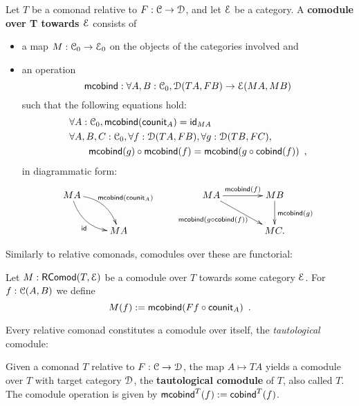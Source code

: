 \documentclass[a4paper,USenglish]{lipics}
\newcommand{\fat}[1]{\textbf{#1}}
\newcommand{\itemizedist}{.5em}
\begin{document}
\begin{defn}%
\label{def:comodule}
 Let $T$ be a comonad relative to $F:\C\to\D$, and let $\E$ be a category.
 A \fat{comodule over T towards $\E$} consists of
   \begin{itemize}\setlength{\itemsep}{\itemizedist}
   \item a map $M:\C_0 \to \E_0$ on the objects of the categories involved and
   \item an operation \[\mcobind: \forall A,B:\C_0, \D(TA,FB) \to \E(MA,MB)\] such that the following equations hold:
 \begin{align}
 &  \forall A : \C_0, \mcobind(\counit_A) = \id_{MA} \\
 & \forall A,B,C:\C_0, \forall f : \D(TA,FB),\forall g:\D(TB,FC), \notag\\
 &   \qquad      \comp{\mcobind(f)}{\mcobind(g)} = \mcobind(\comp{\cobind(f)}{g}) \enspace ,
 \end{align}
  in diagrammatic form:
\[
    \begin{xy}
    \xymatrix{
                       MA \ar@/^1pc/[rd]^{\mcobind(\counit_A)} \ar@/_1pc/[rd]_{\id}& \\
                          & MA
    }
   \end{xy}
   \qquad
   \begin{xy}
    \xymatrix@C=4em{
       MA \ar[r]^{\mcobind(f)} \ar[rd]_{\mcobind(\comp{\cobind(f)}{g})\;\;\;\;\;}& MB \ar[d]^{\mcobind(g)} \\
          & MC .
    }
   \end{xy}
\]  
  
  
  \end{itemize}

\end{defn}


Similarly to relative comonads, comodules over these are functorial:
\begin{defn}
\label{def:comodule_lift}
 Let $M : \RComod(T,\E)$ be a comodule over $T$ towards some category $\E$. For $f : \C(A,B)$ we define
  \[ M(f) := \mcobind(\comp{\counit_A}{Ff}) \enspace .  \]
\end{defn}

\noindent
Every relative comonad constitutes a comodule over itself, the \emph{tautological} comodule:

\begin{defn}
\label{def:tautological_comodule}
  Given a comonad $T$ relative to $F:\C\to\D$, the map $A \mapsto TA$ yields a comodule over $T$ 
  with target category $\D$, the \textbf{tautological comodule} of $T$, also called $T$.
  The comodule operation is given by
    $  \mcobind^T(f) := \cobind^T(f)$. 
\end{defn}
\end{document}
